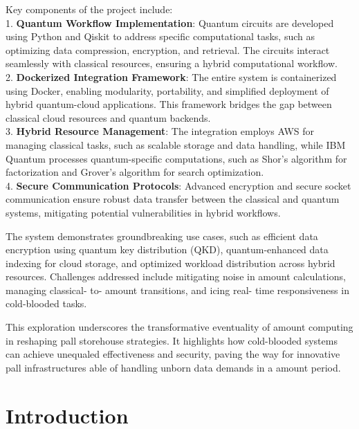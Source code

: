 \documentclass[12pt,a4paper]{article}
\begin{document}
Key components of the project include:  \\
1. \textbf{Quantum Workflow Implementation}: Quantum circuits are developed using Python and Qiskit to address specific computational tasks, such as optimizing data compression, encryption, and retrieval. The circuits interact seamlessly with classical resources, ensuring a hybrid computational workflow.  \\
2. \textbf{Dockerized Integration Framework}: The entire system is containerized using Docker, enabling modularity, portability, and simplified deployment of hybrid quantum-cloud applications. This framework bridges the gap between classical cloud resources and quantum backends.  \\
3. \textbf{Hybrid Resource Management}: The integration employs AWS for managing classical tasks, such as scalable storage and data handling, while IBM Quantum processes quantum-specific computations, such as Shor’s algorithm for factorization and Grover’s algorithm for search optimization.  \\
4. \textbf{Secure Communication Protocols}: Advanced encryption and secure socket communication ensure robust data transfer between the classical and quantum systems, mitigating potential vulnerabilities in hybrid workflows.  

The system demonstrates groundbreaking use cases, such as efficient data encryption using quantum key distribution (QKD), quantum-enhanced data indexing for cloud storage, and optimized workload distribution across hybrid resources. Challenges addressed include mitigating noise in amount  calculations, managing classical- to- amount transitions, and  icing real- time responsiveness in cold-blooded  tasks. 
 
 This  exploration underscores the transformative  eventuality of amount computing in reshaping  pall  storehouse strategies. It highlights how cold-blooded  systems can achieve  unequaled   effectiveness and security, paving the way for innovative  pall  infrastructures able of handling  unborn data demands in a amount  period. 

\newpage


\begin{center}
    \fontsize{14}{16}\selectfont \bfseries
    \section{Introduction}
    \end{center}
\end{document}
